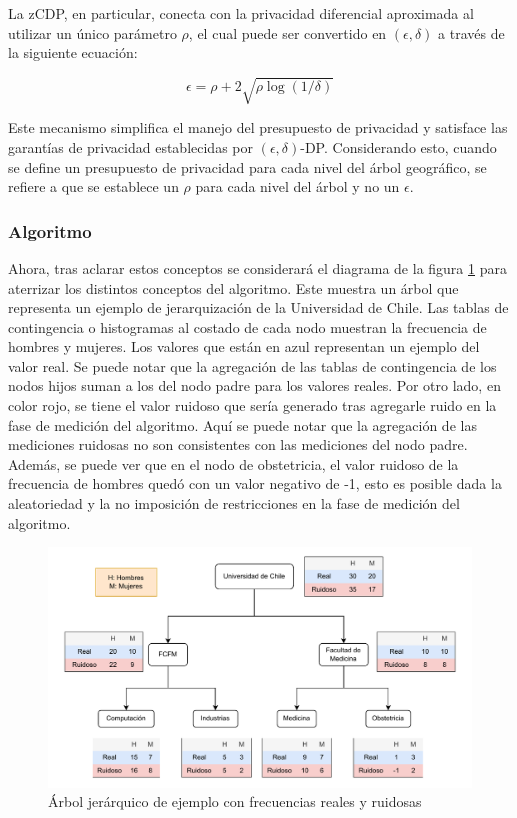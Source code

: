 \documentclass[informe]{upropuesta}
\begin{document}
La zCDP, en particular, conecta con la privacidad diferencial aproximada al utilizar un único parámetro $\rho$, el cual puede ser convertido en $(\epsilon, \delta)$ a través de la siguiente ecuación: 

$$\epsilon = \rho + 2\sqrt{\rho \log(1/\delta)}$$

Este mecanismo simplifica el manejo del presupuesto de privacidad y satisface las garantías de privacidad establecidas por $(\epsilon, \delta)$-DP. Considerando esto, cuando se define un presupuesto de privacidad para cada nivel del árbol geográfico, se refiere a que se establece un $\rho$ para cada nivel del árbol y no un $\epsilon$.

\subsubsection*{Algoritmo}
 
Ahora, tras aclarar estos conceptos se considerará el diagrama de la figura \ref{fig:TopDown_diagramm_example} para aterrizar los distintos conceptos del algoritmo. Este muestra un árbol que representa un ejemplo de jerarquización de la Universidad de Chile. Las tablas de contingencia o histogramas al costado de cada nodo muestran la frecuencia de hombres y mujeres. Los valores que están en azul representan un ejemplo del valor real. Se puede notar que la agregación de las tablas de contingencia de los nodos hijos suman a los del nodo padre para los valores reales. Por otro lado, en color rojo, se tiene el valor ruidoso que sería generado tras agregarle ruido en la fase de medición del algoritmo. Aquí se puede notar que la agregación de las mediciones ruidosas no son consistentes con las mediciones del nodo padre. Además, se puede ver que en el nodo de obstetricia, el valor ruidoso de la frecuencia de hombres quedó con un valor negativo de -1, esto es posible dada la aleatoriedad y la no imposición de restricciones en la fase de medición del algoritmo.

\begin{figure}[H]
    \centering
    \includegraphics[width=\linewidth]{imagenes/investigacion/TopDown_dummy_example.pdf}
    \caption{Árbol jerárquico de ejemplo con frecuencias reales y ruidosas}
    \label{fig:TopDown_diagramm_example}
\end{figure}
\end{document}
